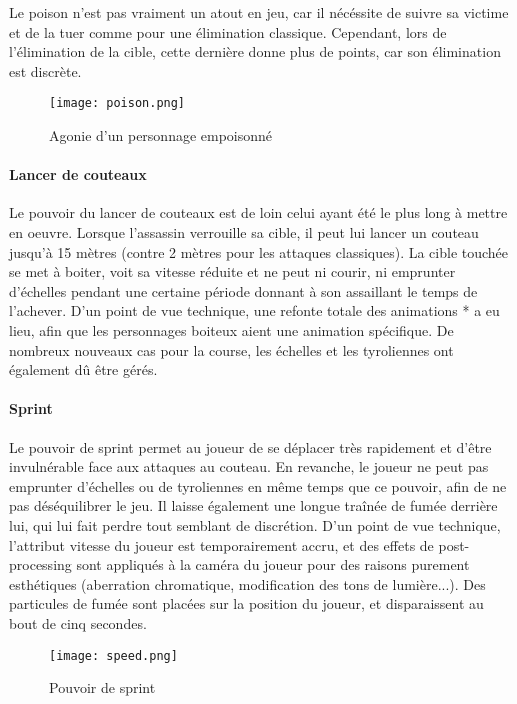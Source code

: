 			Le poison n'est pas vraiment un atout en jeu, car il nécéssite de suivre sa victime et de la tuer comme pour une 
			élimination classique. Cependant, lors de l'élimination de la cible, cette dernière donne plus de points, car son 
			élimination est discrète.
			
			\begin{figure}[hbt!]
				\centering
				\texttt{[image: poison.png]}
				\caption{Agonie d'un personnage empoisonné}
			\end{figure}
			\FloatBarrier

		
		\paragraph{Lancer de couteaux}

			Le pouvoir du lancer de couteaux est de loin celui ayant été le plus long à mettre en oeuvre. Lorsque l'assassin 
			verrouille sa cible, il peut lui lancer un couteau jusqu'à 15 mètres (contre 2 mètres pour les attaques classiques).
			La cible touchée se met à boiter, voit sa vitesse réduite et ne peut ni courir, ni emprunter d'échelles pendant une certaine 
			période donnant à son assaillant le temps de l'achever. D'un point de vue technique, une refonte totale des animations *
			a eu lieu, afin que les personnages boiteux aient une animation spécifique. De nombreux nouveaux cas pour la course, les 
			échelles et les tyroliennes ont également dû être gérés. 


		\paragraph{Sprint}
	
			Le pouvoir de sprint permet au joueur de se déplacer très rapidement et d'être invulnérable face aux attaques 
			au couteau. En revanche, le joueur ne peut pas emprunter d'échelles ou de tyroliennes en même temps que ce pouvoir, afin 
			de ne pas déséquilibrer le jeu. Il laisse également une longue traînée de fumée derrière lui, qui lui fait perdre 
			tout semblant de discrétion. D'un point de vue technique, l'attribut vitesse du joueur est temporairement accru, 
			et des effets de post-processing sont appliqués à la caméra du joueur pour des raisons purement esthétiques (aberration 
			chromatique, modification des tons de lumière...). Des particules de fumée sont placées sur la position du joueur, et 
			disparaissent au bout de cinq secondes.

			\begin{figure}[hbt!]
				\centering
				\texttt{[image: speed.png]}
				\caption{Pouvoir de sprint}
			\end{figure}
			\FloatBarrier

